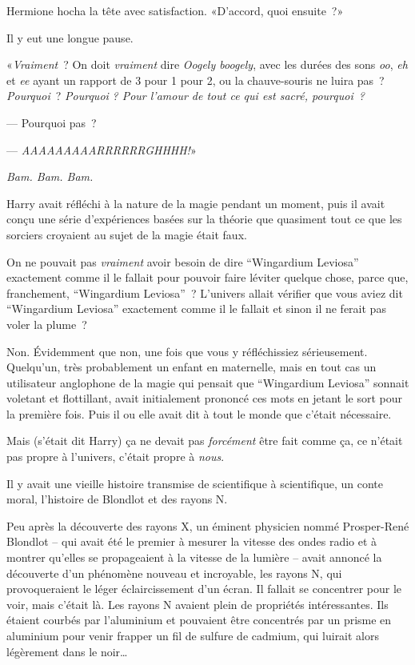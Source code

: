 Hermione hocha la tête avec satisfaction. «D'accord, quoi ensuite~?»

Il y eut une longue pause.

«\emph{Vraiment}~? On doit \emph{vraiment} dire \emph{Oogely boogely}, avec les durées des sons \emph{oo}, \emph{eh} et \emph{ee} ayant un rapport de 3 pour 1 pour 2, ou la chauve-souris ne luira pas~? \emph{Pourquoi}~? \emph{Pourquoi} \emph{? Pour l'amour de tout ce qui est sacré, pourquoi~?}

--- Pourquoi pas~?

--- \emph{AAAAAAAAARRRRRRGHHHH!}»

\emph{Bam. Bam. Bam.}

Harry avait réfléchi à la nature de la magie pendant un moment, puis il avait conçu une série d'expériences basées sur la théorie que quasiment tout ce que les sorciers croyaient au sujet de la magie était faux.

On ne pouvait pas \emph{vraiment} avoir besoin de dire “Wingardium Leviosa” exactement comme il le fallait pour pouvoir faire léviter quelque chose, parce que, franchement, “Wingardium Leviosa”~? L'univers allait vérifier que vous aviez dit “Wingardium Leviosa” exactement comme il le fallait et sinon il ne ferait pas voler la plume~?

Non. Évidemment que non, une fois que vous y réfléchissiez sérieusement. Quelqu'un, très probablement un enfant en maternelle, mais en tout cas un utilisateur anglophone de la magie qui pensait que “Wingardium Leviosa” sonnait voletant et flottillant, avait initialement prononcé ces mots en jetant le sort pour la première fois. Puis il ou elle avait dit à tout le monde que c'était nécessaire.

Mais (s'était dit Harry) ça ne devait pas \emph{forcément} être fait comme ça, ce n'était pas propre à l'univers, c'était propre à \emph{nous}.

Il y avait une vieille histoire transmise de scientifique à scientifique, un conte moral, l'histoire de Blondlot et des rayons N.

Peu après la découverte des rayons X, un éminent physicien nommé Prosper-René Blondlot -- qui avait été le premier à mesurer la vitesse des ondes radio et à montrer qu'elles se propageaient à la vitesse de la lumière -- avait annoncé la découverte d'un phénomène nouveau et incroyable, les rayons N, qui provoqueraient le léger éclaircissement d'un écran. Il fallait se concentrer pour le voir, mais c'était là. Les rayons N avaient plein de propriétés intéressantes. Ils étaient courbés par l'aluminium et pouvaient être concentrés par un prisme en aluminium pour venir frapper un fil de sulfure de cadmium, qui luirait alors légèrement dans le noir…

